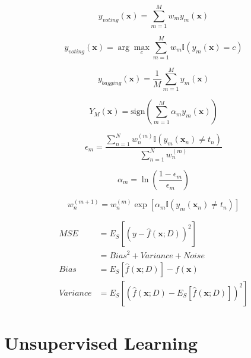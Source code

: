 \documentclass{article}
\begin{document}
\begin{equation}
    y_{voting}(\mathbf{x}) = \sum_{m=1}^M w_m y_m(\mathbf{x})
\end{equation}

\begin{equation}
    y_{voting}(\mathbf{x}) = \arg\max_c \sum_{m=1}^M w_m \mathbb{I}(y_m(\mathbf{x}) = c)
\end{equation}

\begin{equation}
    y_{bagging}(\mathbf{x}) = \frac{1}{M} \sum_{m=1}^M y_m(\mathbf{x})
\end{equation}

\begin{equation}
    Y_M(\mathbf{x}) = \text{sign} \left( \sum_{m=1}^M \alpha_m y_m(\mathbf{x}) \right)
\end{equation}

\begin{equation}
    \epsilon_m = \frac{\sum_{n=1}^N w_n^{(m)} \mathbb{I}(y_m(\mathbf{x}_n) \neq t_n)}{\sum_{n=1}^N w_n^{(m)}}
\end{equation}

\begin{equation}
    \alpha_m = \ln \left( \frac{1 - \epsilon_m}{\epsilon_m} \right)
\end{equation}

\begin{equation}
    w_n^{(m+1)} = w_n^{(m)} \exp[ \alpha_m \mathbb{I}(y_m(\mathbf{x}_n) \neq t_n) ]
\end{equation}

\begin{equation}
    \begin{aligned}
        MSE &= E_S[(y - \hat{f}(\mathbf{x}; D))^2] \\
        &= Bias^2 + Variance + Noise \\
        Bias &= E_S[\hat{f}(\mathbf{x}; D)] - f(\mathbf{x}) \\
        Variance &= E_S[(\hat{f}(\mathbf{x}; D) - E_S[\hat{f}(\mathbf{x}; D)])^2]
    \end{aligned}
\end{equation}


\section{Unsupervised Learning}
\end{document}
